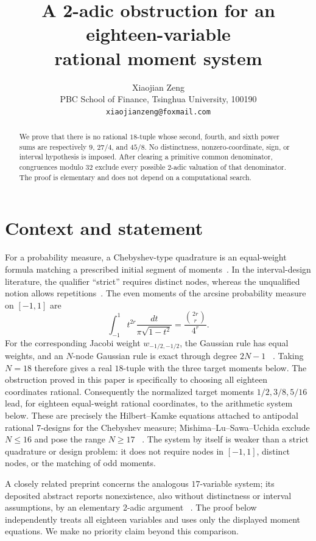 \documentclass[11pt]{article}
\title{A 2-adic obstruction for an eighteen-variable\\rational moment system}
\author{Xiaojian Zeng\\
  \small PBC School of Finance, Tsinghua University, 100190\\
  \small \texttt{xiaojianzeng@foxmail.com}}
\date{}
\begin{document}
\maketitle

\begin{abstract}
We prove that there is no rational \(18\)-tuple whose second, fourth, and
sixth power sums are respectively \(9\), \(27/4\), and \(45/8\).  No
distinctness, nonzero-coordinate, sign, or interval hypothesis is imposed.
After clearing a primitive common denominator, congruences modulo \(32\)
exclude every possible 2-adic valuation of that denominator.  The proof is
elementary and does not depend on a computational search.
\end{abstract}

\section{Context and statement}

For a probability measure, a Chebyshev-type quadrature is an equal-weight
formula matching a prescribed initial segment of moments~\cite{Peled2010}.
In the interval-design literature, the qualifier ``strict'' requires
distinct nodes, whereas
the unqualified notion allows repetitions~\cite{MisawaMunemasaSawa2026}.
The even moments of the arcsine probability measure on \([-1,1]\) are
\[
  \int_{-1}^{1}t^{2r}\frac{dt}{\pi\sqrt{1-t^2}}
  =\frac{\binom{2r}{r}}{4^r}.
\]
For the corresponding Jacobi weight
\(w_{-1/2,-1/2}\), the Gaussian rule has equal weights, and an
\(N\)-node Gaussian rule is exact through degree \(2N-1\)
~\cite{GilboaPeled2017}.  Taking \(N=18\) therefore gives a real
\(18\)-tuple with the three target moments below.  The obstruction proved in
this paper is specifically to choosing all eighteen coordinates rational.
Consequently the normalized target moments \(1/2,3/8,5/16\) lead, for
eighteen equal-weight rational coordinates, to the arithmetic system below.
These are precisely the Hilbert--Kamke equations attached to antipodal
rational \(7\)-designs for the Chebyshev measure; Mishima--Lu--Sawa--Uchida
exclude \(N\leq16\) and pose the range \(N\geq17\)~
\cite{MishimaLuSawaUchida2026}.  The system by itself is weaker than a strict
quadrature or design problem: it does not require nodes in \([-1,1]\),
distinct nodes, or the matching of odd moments.

A closely related preprint concerns the analogous \(17\)-variable system;
its deposited abstract reports nonexistence, also without distinctness or
interval assumptions, by an elementary 2-adic argument~
\cite{Zeng2026SSRN7385178}.  The
proof below independently treats all eighteen variables and uses only the
displayed moment equations.  We make no priority claim beyond this comparison.
\end{document}
